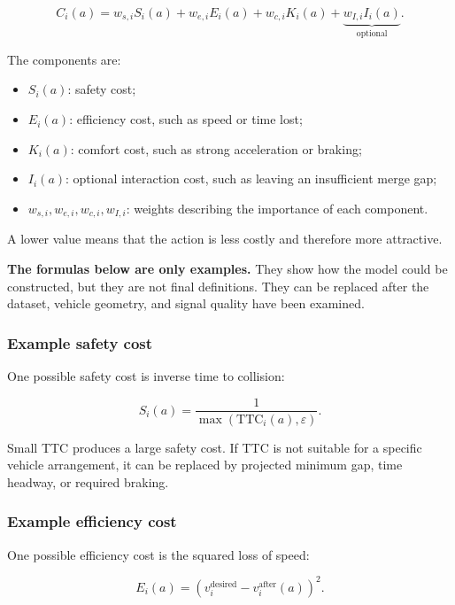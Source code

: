 \documentclass[11pt,a4paper]{article}
\begin{document}
\begin{equation}
C_i(a)
=
w_{s,i}S_i(a)
+
w_{e,i}E_i(a)
+
w_{c,i}K_i(a)
+
\underbrace{w_{I,i}I_i(a)}_{\text{optional}}.
\end{equation}

The components are:

\begin{itemize}[noitemsep]
  \item $S_i(a)$: safety cost;
  \item $E_i(a)$: efficiency cost, such as speed or time lost;
  \item $K_i(a)$: comfort cost, such as strong acceleration or braking;
  \item $I_i(a)$: optional interaction cost, such as leaving an insufficient merge gap;
  \item $w_{s,i},w_{e,i},w_{c,i},w_{I,i}$: weights describing the importance of each component.
\end{itemize}

A lower value means that the action is less costly and therefore more attractive.

\textbf{The formulas below are only examples.} They show how the model could be constructed, but they are not final definitions. They can be replaced after the dataset, vehicle geometry, and signal quality have been examined.

\subsubsection{Example safety cost}

One possible safety cost is inverse time to collision:

\begin{equation}
S_i(a)
=
\frac{1}{\max(\mathrm{TTC}_i(a),\varepsilon)}.
\end{equation}

Small TTC produces a large safety cost. If TTC is not suitable for a specific vehicle arrangement, it can be replaced by projected minimum gap, time headway, or required braking.

\subsubsection{Example efficiency cost}

One possible efficiency cost is the squared loss of speed:

\begin{equation}
E_i(a)
=
\left(v_i^{\mathrm{desired}}-v_i^{\mathrm{after}}(a)\right)^2.
\end{equation}
\end{document}
